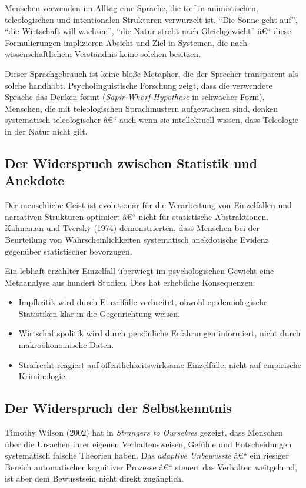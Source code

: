 ﻿\documentclass[12pt, a4paper]{article}
\begin{document}
Menschen verwenden im Alltag eine Sprache, die tief in animistischen,
teleologischen und intentionalen Strukturen verwurzelt ist. \enquote{Die Sonne
geht auf}, \enquote{die Wirtschaft will wachsen}, \enquote{die Natur strebt
nach Gleichgewicht} â€“ diese Formulierungen implizieren Absicht und Ziel in
Systemen, die nach wissenschaftlichem Verständnis keine solchen besitzen.

Dieser Sprachgebrauch ist keine bloße Metapher, die der Sprecher transparent
als solche handhabt. Psycholinguistische Forschung zeigt, dass die verwendete
Sprache das Denken formt (\emph{Sapir-Whorf-Hypothese} in schwacher Form).
Menschen, die mit teleologischen Sprachmustern aufgewachsen sind, denken
systematisch teleologischer â€“ auch wenn sie intellektuell wissen, dass
Teleologie in der Natur nicht gilt.

\subsection{Der Widerspruch zwischen Statistik und Anekdote}

Der menschliche Geist ist evolutionär für die Verarbeitung von Einzelfällen und
narrativen Strukturen optimiert â€“ nicht für statistische Abstraktionen.
Kahneman und Tversky (1974) demonstrierten, dass Menschen bei der Beurteilung
von Wahrscheinlichkeiten systematisch anekdotische Evidenz gegenüber
statistischer bevorzugen.

Ein lebhaft erzählter Einzelfall überwiegt im psychologischen Gewicht eine
Metaanalyse aus hundert Studien. Dies hat erhebliche Konsequenzen:

\begin{itemize}
  \item Impfkritik wird durch Einzelfälle verbreitet, obwohl epidemiologische
    Statistiken klar in die Gegenrichtung weisen.
  \item Wirtschaftspolitik wird durch persönliche Erfahrungen informiert,
    nicht durch makroökonomische Daten.
  \item Strafrecht reagiert auf öffentlichkeitswirksame Einzelfälle, nicht
    auf empirische Kriminologie.
\end{itemize}

\subsection{Der Widerspruch der Selbstkenntnis}

Timothy Wilson (2002) hat in \textit{Strangers to Ourselves} gezeigt, dass
Menschen über die Ursachen ihrer eigenen Verhaltensweisen, Gefühle und
Entscheidungen systematisch falsche Theorien haben. Das \emph{adaptive Unbewusste}
â€“ ein riesiger Bereich automatischer kognitiver Prozesse â€“ steuert das Verhalten
weitgehend, ist aber dem Bewusstsein nicht direkt zugänglich.
\end{document}
